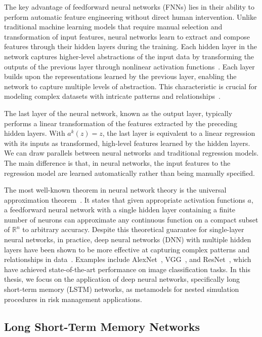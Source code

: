 The key advantage of feedforward neural networks (FNNs) lies in their ability to perform automatic feature engineering without direct human intervention. 
Unlike traditional machine learning models that require manual selection and transformation of input features, neural networks learn to extract and compose features through their hidden layers during the training. 
Each hidden layer in the network captures higher-level abstractions of the input data by transforming the outputs of the previous layer through nonlinear activation functions~\citep{lecun2015deep}.
Each layer builds upon the representations learned by the previous layer, enabling the network to capture multiple levels of abstraction. 
This characteristic is crucial for modeling complex datasets with intricate patterns and relationships~\citep{bengio2013representation}.

The last layer of the neural network, known as the output layer, typically performs a linear transformation of the features extracted by the preceding hidden layers. 
With $a^{k}(z) = z$, the last layer is equivalent to a linear regression with its inputs as transformed, high-level features learned by the hidden layers.
We can draw parallels between neural networks and traditional regression models. 
The main difference is that, in neural networks, the input features to the regression model are learned automatically rather than being manually specified.

The most well-known theorem in neural network theory is the universal approximation theorem~\citep{hornik1989multilayer}.
It states that given appropriate activation functions $a$, a feedforward neural network with a single hidden layer containing a finite number of neurons can approximate any continuous function on a compact subset of $\mathbb{R}^n$ to arbitrary accuracy. 
Despite this theoretical guarantee for single-layer neural networks, in practice, deep neural networks (DNN) with multiple hidden layers have been shown to be more effective at capturing complex patterns and relationships in data~\citep{lecun2015deep}.
Examples include AlexNet~\citep{krizhevsky2012imagenet}, VGG~\citep{simonyan2014very}, and ResNet~\citep{he2016deep}, which have achieved state-of-the-art performance on image classification tasks.
In this thesis, we focus on the application of deep neural networks, specifically long short-term memory (LSTM) networks, as metamodels for nested simulation procedures in risk management applications.

\subsection{Long Short-Term Memory Networks} \label{subsec:LSTM}

